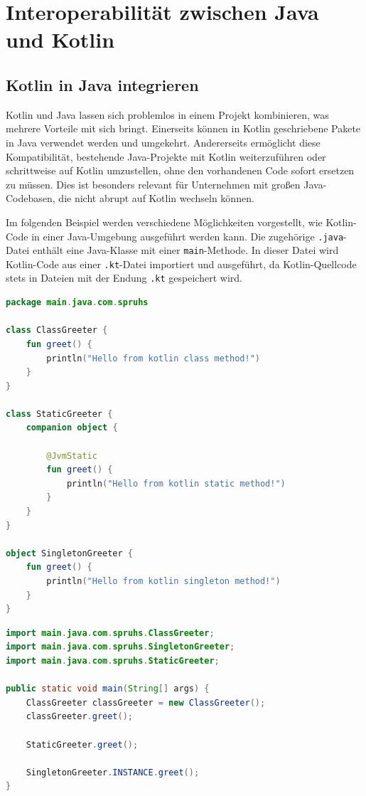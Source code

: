 \documentclass[11pt]{article}
\begin{document}
    \section{Interoperabilität zwischen Java und Kotlin}

    \subsection{Kotlin in Java integrieren}
    Kotlin und Java lassen sich problemlos in einem Projekt kombinieren, was mehrere Vorteile mit sich bringt.
    Einerseits können in Kotlin geschriebene Pakete in Java verwendet werden und umgekehrt.
    Andererseits ermöglicht diese Kompatibilität, bestehende Java-Projekte mit Kotlin weiterzuführen oder
    schrittweise auf Kotlin umzustellen, ohne den vorhandenen Code sofort ersetzen zu müssen.
    Dies ist besonders relevant für Unternehmen mit großen Java-Codebasen, die nicht abrupt auf Kotlin wechseln können. \cite[20]{kotlin-handbuch}

    Im folgenden Beispiel werden verschiedene Möglichkeiten vorgestellt, wie Kotlin-Code in einer Java-Umgebung ausgeführt
    werden kann. Die zugehörige \texttt{.java}-Datei enthält eine Java-Klasse mit einer \texttt{main}-Methode.
    In dieser Datei wird Kotlin-Code aus einer \texttt{.kt}-Datei importiert und ausgeführt, da Kotlin-Quellcode stets
    in Dateien mit der Endung \texttt{.kt} gespeichert wird.

    \begin{lstlisting}[language=Kotlin, caption={KotlinGreeter.kt}]
package main.java.com.spruhs

class ClassGreeter {
    fun greet() {
        println("Hello from kotlin class method!")
    }
}

class StaticGreeter {
    companion object {

        @JvmStatic
        fun greet() {
            println("Hello from kotlin static method!")
        }
    }
}

object SingletonGreeter {
    fun greet() {
        println("Hello from kotlin singleton method!")
    }
}
    \end{lstlisting}

    \begin{lstlisting}[language=Java, caption={Main.java}]
import main.java.com.spruhs.ClassGreeter;
import main.java.com.spruhs.SingletonGreeter;
import main.java.com.spruhs.StaticGreeter;

public static void main(String[] args) {
    ClassGreeter classGreeter = new ClassGreeter();
    classGreeter.greet();

    StaticGreeter.greet();

    SingletonGreeter.INSTANCE.greet();
}
    \end{lstlisting}
\end{document}
